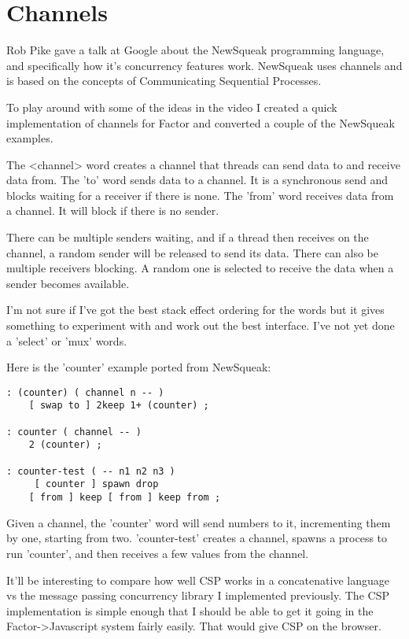 \chapter{Channels}\label{channels}

Rob Pike gave a talk at Google about the NewSqueak programming
language, and specifically how it's concurrency features
work. NewSqueak uses channels and is based on the concepts of
Communicating Sequential Processes.

To play around with some of the ideas in the video I created a quick implementation of channels for Factor and converted a couple of the NewSqueak examples.

The <channel> word creates a channel that threads can send data to and
receive data from. The 'to' word sends data to a channel. It is a
synchronous send and blocks waiting for a receiver if there is
none. The 'from' word receives data from a channel. It will block if
there is no sender.

There can be multiple senders waiting, and if a thread then receives
on the channel, a random sender will be released to send its
data. There can also be multiple receivers blocking. A random one is
selected to receive the data when a sender becomes available.

I'm not sure if I've got the best stack effect ordering for the words
but it gives something to experiment with and work out the best
interface. I've not yet done a 'select' or 'mux' words.

Here is the 'counter' example ported from NewSqueak:

\begin{verbatim}
: (counter) ( channel n -- )
    [ swap to ] 2keep 1+ (counter) ;
    
: counter ( channel -- )
    2 (counter) ;    

: counter-test ( -- n1 n2 n3 )
     [ counter ] spawn drop 
    [ from ] keep [ from ] keep from ;
\end{verbatim}

Given a channel, the 'counter' word will send numbers to it,
incrementing them by one, starting from two. 'counter-test' creates a
channel, spawns a process to run 'counter', and then receives a few
values from the channel.

It'll be interesting to compare how well CSP works in a concatenative
 language vs the message passing concurrency library I implemented
 previously. The CSP implementation is simple enough that I should be
 able to get it going in the Factor->Javascript system fairly
 easily. That would give CSP on the browser.
